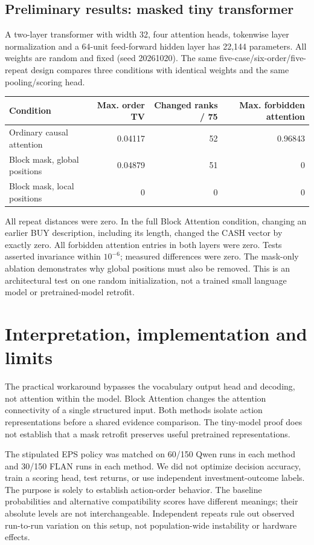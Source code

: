 \documentclass[11pt]{article}
\begin{document}
\subsection*{Preliminary results: masked tiny transformer}
A two-layer transformer with width 32, four attention heads, tokenwise layer normalization and a 64-unit feed-forward hidden layer has 22,144 parameters. All weights are random and fixed (seed 20261020). The same five-case/six-order/five-repeat design compares three conditions with identical weights and the same pooling/scoring head.
\begin{center}\small
\begin{tabular}{lrrr}\toprule
Condition & Max. order TV & Changed ranks / 75 & Max. forbidden attention\\\midrule
Ordinary causal attention & 0.04117 & 52 & 0.96843\\
Block mask, global positions & 0.04879 & 51 & 0\\
Block mask, local positions & 0 & 0 & 0\\\bottomrule
\end{tabular}\end{center}
All repeat distances were zero. In the full Block Attention condition, changing an earlier BUY description, including its length, changed the CASH vector by exactly zero. All forbidden attention entries in both layers were zero. Tests asserted invariance within $10^{-6}$; measured differences were zero. The mask-only ablation demonstrates why global positions must also be removed. This is an architectural test on one random initialization, not a trained small language model or pretrained-model retrofit.
\newpage
\section{Interpretation, implementation and limits}
The practical workaround bypasses the vocabulary output head and decoding, not attention within the model. Block Attention changes the attention connectivity of a single structured input. Both methods isolate action representations before a shared evidence comparison. The tiny-model proof does not establish that a mask retrofit preserves useful pretrained representations.

The stipulated EPS policy was matched on 60/150 Qwen runs in each method and 30/150 FLAN runs in each method. We did not optimize decision accuracy, train a scoring head, test returns, or use independent investment-outcome labels. The purpose is solely to establish action-order behavior. The baseline probabilities and alternative compatibility scores have different meanings; their absolute levels are not interchangeable. Independent repeats rule out observed run-to-run variation on this setup, not population-wide instability or hardware effects.
\end{document}
